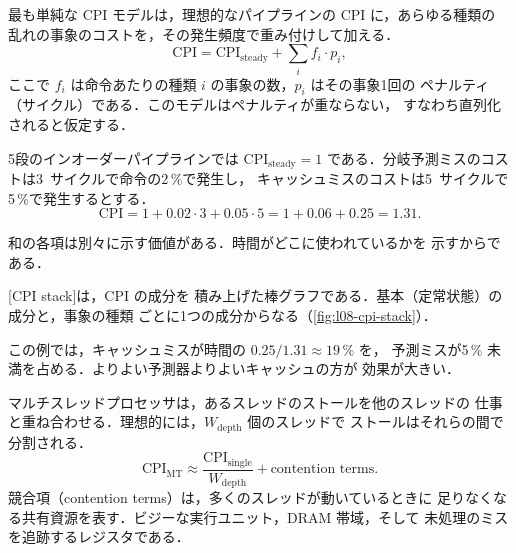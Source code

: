 \documentclass[../main.tex]{subfiles}
\begin{document}
最も単純な CPI モデルは，理想的なパイプラインの CPI に，あらゆる種類の
乱れの事象のコストを，その発生頻度で重み付けして加える．
\begin{equation}
  \mathrm{CPI} = \mathrm{CPI}_{\text{steady}} +
    \sum_{i} f_i \cdot p_i ,
  \label{eq:l08-cpi}
\end{equation}
ここで $f_i$ は命令あたりの種類 $i$ の事象の数，$p_i$ はその事象1回の
ペナルティ（サイクル）である．このモデルはペナルティが重ならない，
すなわち直列化されると仮定する．

\begin{example}
  \label{ex:l08-cpi}
  5段のインオーダーパイプラインでは $\mathrm{CPI}_{\text{steady}} = 1$
  である．分岐予測ミスのコストは\num{3}~サイクルで命令の2\,\%で発生し，
  キャッシュミスのコストは\num{5}~サイクルで5\,\%で発生するとする．
  \[
    \mathrm{CPI} = 1 + 0.02 \cdot 3 + 0.05 \cdot 5 = 1 + 0.06 + 0.25
    = 1.31 .
  \]
\end{example}

\begin{marginfigure}
  \resizebox{\linewidth}{!}{}
  \caption{\cref{ex:l08-cpi}の CPI スタック．}
  \label{fig:l08-cpi-stack}
\end{marginfigure}

和の各項は別々に示す価値がある．時間がどこに使われているかを
示すからである．

\begin{definition}
  \label{def:l08-cpi-stack}
  [CPI stack]は，CPI の成分を
  積み上げた棒グラフである．基本（定常状態）の成分と，事象の種類
  ごとに1つの成分からなる（\cref{fig:l08-cpi-stack}）．
\end{definition}

この例では，キャッシュミスが時間の $0.25/1.31 \approx 19\,\%$ を，
予測ミスが5\,\% 未満を占める．よりよい予測器よりよいキャッシュの方が
効果が大きい．

マルチスレッドプロセッサは，あるスレッドのストールを他のスレッドの
仕事と重ね合わせる．理想的には，$W_{\text{depth}}$ 個のスレッドで
ストールはそれらの間で分割される．
\begin{equation}
  \mathrm{CPI}_{\text{MT}} \approx
    \frac{\mathrm{CPI}_{\text{single}}}{W_{\text{depth}}}
    + \text{contention terms}.
  \label{eq:l08-cpi-mt}
\end{equation}
競合項（contention terms）は，多くのスレッドが動いているときに
足りなくなる共有資源を表す．ビジーな実行ユニット，DRAM 帯域，そして
未処理のミスを追跡するレジスタである．
\end{document}

